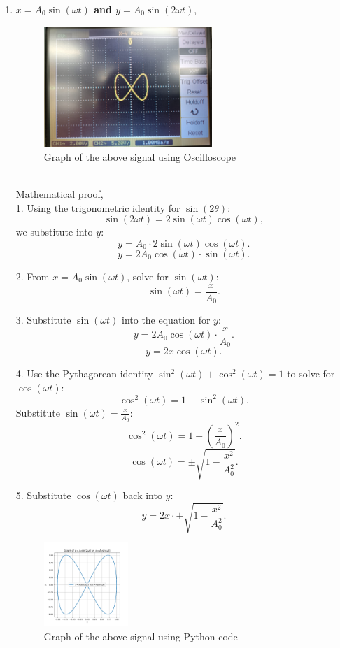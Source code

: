 \begin{enumerate}
\newpage
\item \textbf{\large \textbf{$x = A_0 \sin(\omega t)$} and \textbf{$y = A_0 \sin(2\omega t)$}},
\begin{figure}[h!]
\centering
\includegraphics[width=0.6\textwidth]{actualgraph/infin.jpeg}
\caption{Graph of the above signal using Oscilloscope}
\label{fig:sample_image}
\end{figure}\\
Mathematical proof,\\
1. Using the trigonometric identity for \( \sin(2\theta) \):
\[
\sin(2\omega t) = 2 \sin(\omega t) \cos(\omega t),
\]
we substitute into \( y \):
\[
y = A_0 \cdot 2 \sin(\omega t) \cos(\omega t).
\]
\[
y = 2 A_0 \cos(\omega t) \cdot \sin(\omega t).
\]

2. From \( x = A_0 \sin(\omega t) \), solve for \( \sin(\omega t) \):
\[
\sin(\omega t) = \frac{x}{A_0}.
\]

3. Substitute \( \sin(\omega t) \) into the equation for \( y \):
\[
y = 2 A_0 \cos(\omega t) \cdot \frac{x}{A_0}.
\]
\[
y = 2 x \cos(\omega t).
\]

4. Use the Pythagorean identity \( \sin^2(\omega t) + \cos^2(\omega t) = 1 \) to solve for \( \cos(\omega t) \):
\[
\cos^2(\omega t) = 1 - \sin^2(\omega t).
\]
Substitute \( \sin(\omega t) = \frac{x}{A_0} \):
\[
\cos^2(\omega t) = 1 - \left(\frac{x}{A_0}\right)^2.
\]
\[
\cos(\omega t) = \pm\sqrt{1 - \frac{x^2}{A_0^2}}.
\]

5. Substitute \( \cos(\omega t) \) back into \( y \):
\[
y = 2 x \cdot \pm\sqrt{1 - \frac{x^2}{A_0^2}}.
\]


\begin{figure}[h!]
    \centering
    \includegraphics[width=0.3\textwidth]{graphs/Figure_3.png}
    \caption{Graph of the above signal using Python code}
    \label{fig:sample_image}
\end{figure}








\end{enumerate}
